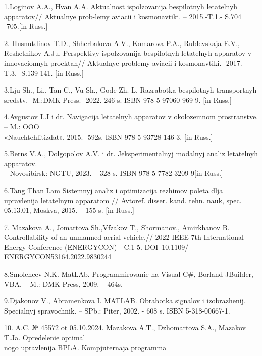   
\begin{noparindent}

1.Loginov A.A., Hvan A.A. Aktual\textquotesingle nost\textquotesingle{}
ispol\textquotesingle zovanija bespilotnyh letatel\textquotesingle nyh
apparatov// Aktual\textquotesingle nye prob-lemy aviacii i kosmonavtiki.
-- 2015.-T.1.- S.704 -705.{[}in Russ.{]}

2. Husnutdinov T.D., Shherbakova A.V., Komarova P.A., Rublevskaja E.V.,
Reshetnikov A.Ju. Perspektivy ispol\textquotesingle zovanija bespilotnyh
letatel\textquotesingle nyh apparatov v innovacionnyh proektah//
Aktual\textquotesingle nye problemy aviacii i kosmonavtiki.- 2017.-
T.3.- S.139-141. {[}in Russ.{]}

3.Lju Sh., Li., Tan C., Vu Sh., God\textquotesingle e Zh.-L. Razrabotka
bespilotnyh transportnyh sredstv.- M.:DMK Press.- 2022.-246 s. ISBN
978-5-97060-969-9. {[}in Russ.{]}

4.Avgustov L.I i dr. Navigacija letatel\textquotesingle nyh apparatov v
okolozemnom prostranstve. -- M.: OOO \\«Nauchtehlitizdat», 2015. -592s.
ISBN 978-5-93728-146-3. {[}in Russ.{]}

5.Berns V.A., Dolgopolov A.V. i dr. Jeksperimental\textquotesingle nyj
modal\textquotesingle nyj analiz letatel\textquotesingle nyh apparatov.
\\-- Novosibirsk: NGTU, 2023. -- 328 s. ISBN 978-5-7782-3209-9{[}in
Russ.{]}

6.Tang Than\textquotesingle{} Lam Sistemnyj analiz i optimizacija
rezhimov poleta dlja upravlenija letatel\textquotesingle nym apparatom
// Avtoref. disser. kand. tehn. nauk, spec. 05.13.01, Moskva, 2015. --
155 s. {[}in Russ.{]}

7. Mazakova A., Jomartova Sh.,Vfzakov T., Shormanov., Amirkhanov B.
Controllability of an unmanned aerial vehicle.// 2022 IEEE 7th
International Energy Conference (ENERGYCON) - C.1-5.
DOI~10.1109/\\ENERGYCON53164.2022.9830244

8.Smolencev N.K. MatLAb. Programmirovanie na Visual C\#, Borland
JBuilder, VBA. -- M.: DMK Press, 2009. -- 464s.

9.D\textquotesingle jakonov V., Abramenkova I. MATLAB. Obrabotka
signalov i izobrazhenij. Special\textquotesingle nyj spravochnik. --
SPb.: Piter, 2002. - 608 s. ISBN 5-318-00667-1.

10. A.C. № 45572 ot 05.10.2024. Mazakova A.T., Dzhomartova S.A., Mazakov
T.Ja. Opredelenie optimal\textquotesingle \\nogo upravlenija BPLA.
Komp\textquotesingle juternaja programma
\end{noparindent}
 
